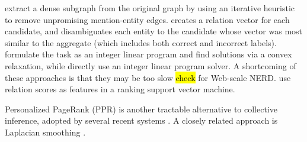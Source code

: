  \cite{Hoffart2011} extract a dense subgraph from the original graph by using an iterative heuristic to remove unpromising mention-entity edges. \cite{Cucerzan07} creates a relation vector for each candidate, and disambiguates each entity to the candidate whose vector was most similar to the aggregate (which includes both correct and incorrect labels).  formulate the task as an integer linear program and find solutions via a convex relaxation, while  directly use an integer linear program solver. A shortcoming of these approaches is that they may be too slow \hl{check} for Web-scale NERD.  use relation scores as features in a ranking support vector machine.
 
 Personalized PageRank (PPR) \cite{jeh2003scaling} is another tractable alternative to collective inference, adopted by several recent systems \cite{Han2011,He13,Alhelbawy14,Pershina2015}. A closely related approach is Laplacian smoothing \cite{Huang2014}.  





